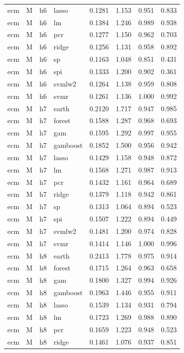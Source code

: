 \begin{ThreePartTable}
\begin{longtable}[t]{llclcccc}
ecm & M & h6 & lasso & 0.1281 & 1.153 & 0.951 & 0.833\\
ecm & M & h6 & lm & 0.1384 & 1.246 & 0.989 & 0.938\\
ecm & M & h6 & pcr & 0.1277 & 1.150 & 0.962 & 0.703\\
ecm & M & h6 & ridge & 0.1256 & 1.131 & 0.958 & 0.892\\
ecm & M & h6 & sp & 0.1163 & 1.048 & 0.851 & 0.431\\
ecm & M & h6 & spi & 0.1333 & 1.200 & 0.902 & 0.361\\
ecm & M & h6 & svmlw2 & 0.1264 & 1.138 & 0.959 & 0.808\\
ecm & M & h6 & svmr & 0.1261 & 1.136 & 1.000 & 0.992\\
\addlinespace
ecm & M & h7 & earth & 0.2120 & 1.717 & 0.947 & 0.985\\
ecm & M & h7 & forest & 0.1588 & 1.287 & 0.968 & 0.693\\
ecm & M & h7 & gam & 0.1595 & 1.292 & 0.997 & 0.955\\
ecm & M & h7 & gamboost & 0.1852 & 1.500 & 0.956 & 0.942\\
ecm & M & h7 & lasso & 0.1429 & 1.158 & 0.948 & 0.872\\
ecm & M & h7 & lm & 0.1568 & 1.271 & 0.987 & 0.913\\
ecm & M & h7 & pcr & 0.1432 & 1.161 & 0.964 & 0.689\\
ecm & M & h7 & ridge & 0.1379 & 1.118 & 0.942 & 0.861\\
ecm & M & h7 & sp & 0.1313 & 1.064 & 0.894 & 0.523\\
ecm & M & h7 & spi & 0.1507 & 1.222 & 0.894 & 0.449\\
ecm & M & h7 & svmlw2 & 0.1481 & 1.200 & 0.974 & 0.828\\
ecm & M & h7 & svmr & 0.1414 & 1.146 & 1.000 & 0.996\\
\addlinespace
ecm & M & h8 & earth & 0.2413 & 1.778 & 0.975 & 0.914\\
ecm & M & h8 & forest & 0.1715 & 1.264 & 0.963 & 0.658\\
ecm & M & h8 & gam & 0.1800 & 1.327 & 0.994 & 0.926\\
ecm & M & h8 & gamboost & 0.1963 & 1.446 & 0.955 & 0.911\\
ecm & M & h8 & lasso & 0.1539 & 1.134 & 0.931 & 0.794\\
ecm & M & h8 & lm & 0.1723 & 1.269 & 0.988 & 0.890\\
ecm & M & h8 & pcr & 0.1659 & 1.223 & 0.948 & 0.523\\
ecm & M & h8 & ridge & 0.1461 & 1.076 & 0.937 & 0.851\\

\end{longtable}
\end{ThreePartTable}
